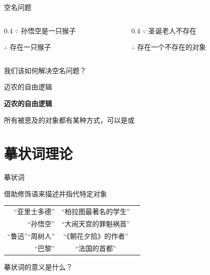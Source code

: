\documentclass{zhslides}
\begin{document}
\begin{frame}{空名问题}
  
  \begin{columns}
  \begin{column}{0.4\textwidth}
    $\because$ 孙悟空是一只猴子
    
    $\therefore$ 存在一只猴子
  \end{column}
  \begin{column}{0.4\textwidth}
    $\because$ 圣诞老人不存在
    
    $\therefore$ 存在一个不存在的对象
  \end{column}
  \end{columns}
  \vspace{2em}
  \pause
  
  \begin{brainstorm*}{}
    我们该如何解决空名问题？
  \end{brainstorm*}
  
\end{frame}


\begin{frame}{迈农的自由逻辑}
  
  \textbf{迈农的自由逻辑}
  \bit
    \item 所有被思及的对象都有某种方式，可以是或
    \item 
  \eit

\end{frame}





\section{摹状词理论}

\begin{frame}{摹状词}
  
  借助修饰语来描述并指代特定对象
  
  \pause
  \begin{center}
  \begin{tabular}{rcl}
    “亚里士多德” & “柏拉图最著名的学生”\\
    “孙悟空” & “大闹天宫的罪魁祸首”\\
    “鲁迅”“周树人” & “《朝花夕拾》的作者”\\
    “巴黎” & “法国的首都”
  \end{tabular}
  \end{center}
  \pause
  
  \begin{brainstorm*}{}
    摹状词的意义是什么？
  \end{brainstorm*}

\end{frame}
\end{document}
